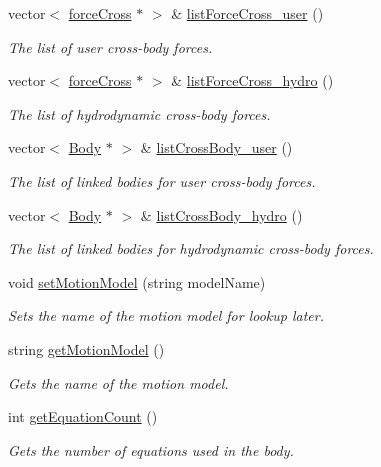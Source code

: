 \begin{DoxyCompactItemize}
vector$<$ \hyperlink{classforce_cross}{force\-Cross} $\ast$ $>$ \& \hyperlink{class_body_ad44837d77c6b6c0b0f3f4d5b2658627a}{list\-Force\-Cross\-\_\-user} ()
\begin{DoxyCompactList}\small\item\em The list of user cross-\/body forces. \end{DoxyCompactList}\item 
vector$<$ \hyperlink{classforce_cross}{force\-Cross} $\ast$ $>$ \& \hyperlink{class_body_a6d71490a913c0ed97ade7bb2976d426a}{list\-Force\-Cross\-\_\-hydro} ()
\begin{DoxyCompactList}\small\item\em The list of hydrodynamic cross-\/body forces. \end{DoxyCompactList}\item 
vector$<$ \hyperlink{class_body}{Body} $\ast$ $>$ \& \hyperlink{class_body_a56ad2b60555f24df3feb5889974b27b2}{list\-Cross\-Body\-\_\-user} ()
\begin{DoxyCompactList}\small\item\em The list of linked bodies for user cross-\/body forces. \end{DoxyCompactList}\item 
vector$<$ \hyperlink{class_body}{Body} $\ast$ $>$ \& \hyperlink{class_body_a7c930213d83962d4248068c38c589113}{list\-Cross\-Body\-\_\-hydro} ()
\begin{DoxyCompactList}\small\item\em The list of linked bodies for hydrodynamic cross-\/body forces. \end{DoxyCompactList}\item 
void \hyperlink{class_body_ae6fe245f2504eac2e3486f28df3c0ca3}{set\-Motion\-Model} (string model\-Name)
\begin{DoxyCompactList}\small\item\em Sets the name of the motion model for lookup later. \end{DoxyCompactList}\item 
string \hyperlink{class_body_ab4340cac445ae26ae751a08c35155386}{get\-Motion\-Model} ()
\begin{DoxyCompactList}\small\item\em Gets the name of the motion model. \end{DoxyCompactList}\item 
int \hyperlink{class_body_a07a8f186c02f0d5bad4beded83949571}{get\-Equation\-Count} ()
\begin{DoxyCompactList}\small\item\em Gets the number of equations used in the body. \end{DoxyCompactList}\end{DoxyCompactItemize}


